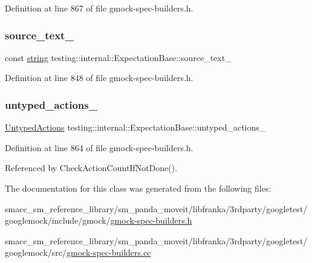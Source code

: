 Definition at line 867 of file gmock-\/spec-\/builders.\+h.

\mbox{\label{classtesting_1_1internal_1_1ExpectationBase_a8803b5fa8354205a6b57e21a704acbef}} 
\subsubsection{\texorpdfstring{source\+\_\+text\+\_\+}{source\_text\_}}
{\footnotesize\ttfamily const \hyperlink{namespacetesting_1_1internal_a8e8ff5b11e64078831112677156cb111}{string} testing\+::internal\+::\+Expectation\+Base\+::source\+\_\+text\+\_\+\hspace{0.3cm}{\ttfamily [protected]}}



Definition at line 848 of file gmock-\/spec-\/builders.\+h.

\mbox{\label{classtesting_1_1internal_1_1ExpectationBase_a9558ff6b8b1b7e3a99fac1f93d1826da}} 
\subsubsection{\texorpdfstring{untyped\+\_\+actions\+\_\+}{untyped\_actions\_}}
{\footnotesize\ttfamily \hyperlink{classtesting_1_1internal_1_1ExpectationBase_a9b21e82059961b9f1198d3f5d518254f}{Untyped\+Actions} testing\+::internal\+::\+Expectation\+Base\+::untyped\+\_\+actions\+\_\+\hspace{0.3cm}{\ttfamily [protected]}}



Definition at line 864 of file gmock-\/spec-\/builders.\+h.



Referenced by Check\+Action\+Count\+If\+Not\+Done().



The documentation for this class was generated from the following files\+:\begin{DoxyCompactItemize}
\item 
smacc\+\_\+sm\+\_\+reference\+\_\+library/sm\+\_\+panda\+\_\+moveit/libfranka/3rdparty/googletest/googlemock/include/gmock/\hyperlink{gmock-spec-builders_8h}{gmock-\/spec-\/builders.\+h}\item 
smacc\+\_\+sm\+\_\+reference\+\_\+library/sm\+\_\+panda\+\_\+moveit/libfranka/3rdparty/googletest/googlemock/src/\hyperlink{gmock-spec-builders_8cc}{gmock-\/spec-\/builders.\+cc}\end{DoxyCompactItemize}
